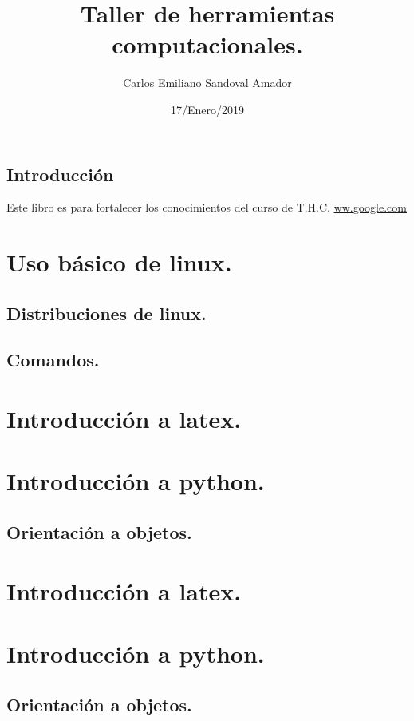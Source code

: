 \documentclass{book}
\title{Taller de herramientas computacionales.}
\author{Carlos Emiliano Sandoval Amador}
\date{17/Enero/2019}
\begin{document}
	\maketitle
	\tableofcontents
	\section*{Introducción} Este libro es para fortalecer los conocimientos del curso de T.H.C.
	\url{ww.google.com}
	
	\chapter{Uso básico de linux.}
	\section{Distribuciones de linux.}
	\section{Comandos.}
	\chapter{Introducción a latex.}
	\chapter{Introducción a python.}
	\section*{Orientación a objetos.}
	
	\chapter{Introducción a latex.}
	\chapter{Introducción a python.}
		
	
	\section*{Orientación a objetos.}
	
\end{document}
